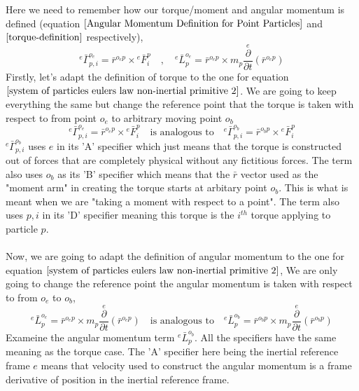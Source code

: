 Here we need to remember how our torque/moment and angular momentum is defined (equation $\ref{Angular Momentum Definition for Point Particles}$ and $\ref{torque-definition}$ respectively),
$${}^{e}\bar{\Gamma}^{o_{e}}_{p,i} = \bar{r}^{o_{e}p}\times{}^{e}\bar{F}^{p}_{i} \quad,\quad 
{}^{e}\bar{L}^{o_{e}}_{p} = \bar{r}^{o_{e}p}\times m_{p}\overset{e}{\frac{\partial}{\partial t}}\left(\bar{r}^{o_{e}p}\right)$$
Firstly, let's adapt the definition of torque to the one for equation $\ref{system of particles eulers law non-inertial primitive 2}$.
We are going to keep everything the same but change the reference point that the torque is taken with respect to from point $o_{e}$ to arbitrary moving point $o_{b}$
\begin{equation}
{}^{e}\bar{\Gamma}^{o_{e}}_{p,i} = \bar{r}^{o_{e}p}\times{}^{e}\bar{F}^{p}_{i} \quad \text{is analogous to}  \quad 
{}^{e}\bar{\Gamma}^{o_{b}}_{p,i} = \bar{r}^{o_{b}p}\times{}^{e}\bar{F}^{p}_{i}
\label{Torque with respect to arbitary point point particle}
\end{equation}
${}^{e}\bar{\Gamma}^{o_{b}}_{p,i}$ uses $e$ in its 'A' specifier which just means that the torque is constructed out of forces that are completely physical without any fictitious forces.
The term also uses $o_{b}$ as its 'B' specifier which means that the $\bar{r}$ vector used as the "moment arm" in creating the torque starts at arbitary point $o_{b}$. 
This is what is meant when we are "taking a moment with respect to a point".
The term also uses $p,i$ in its 'D' specifier meaning this torque is the $i^{th}$ torque applying to particle $p$.
\\~\\Now, we are going to adapt the definition of angular momentum to the one for equation $\ref{system of particles eulers law non-inertial primitive 2}$,
We are only going to change the reference point the angular momentum is taken with respect to from $o_{e}$ to $o_{b}$,
\begin{equation}
{}^{e}\bar{L}^{o_{e}}_{p} = \bar{r}^{o_{e}p}\times m_{p}\overset{e}{\frac{\partial}{\partial t}}\left(\bar{r}^{o_{e}p}\right) \quad \text{is analogous to} \quad 
{}^{e}\bar{L}^{o_{b}}_{p} = \bar{r}^{o_{b}p}\times m_{p}\overset{e}{\frac{\partial}{\partial t}}\left(\bar{r}^{o_{b}p}\right)
\label{Angular Momentum with respect to arbitary point particle}
\end{equation}
Exameine the angular momentum term ${}^{e}\bar{L}^{o_{b}}_{p}$.
All the specifiers have the same meaning as the torque case.
The 'A' specifier here being the inertial reference frame $e$ means that velocity used to construct the angular momentum is a frame derivative of position in the inertial reference frame.
